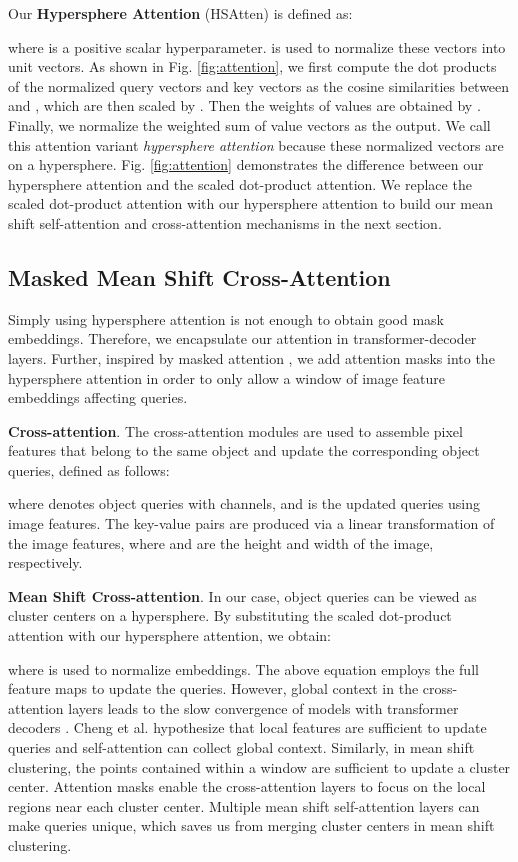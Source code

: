 \documentclass[letterpaper, 10 pt, conference]{ieeeconf}
\begin{document}
Our \textbf{Hypersphere Attention} (HSAtten) is defined as:

where  is a positive scalar hyperparameter.  is used to  normalize these vectors into unit vectors. As shown in Fig. \ref{fig:attention}, we first compute the dot products of the normalized query vectors and key vectors as the cosine similarities between  and , which are then scaled by . Then the weights of values are obtained by . Finally, we normalize the weighted sum of value vectors as the output. We call this attention variant \emph{hypersphere attention} because these  normalized vectors are on a hypersphere. Fig. \ref{fig:attention} demonstrates the difference between our hypersphere attention and the scaled dot-product attention. We replace the scaled dot-product attention with our hypersphere attention to build our mean shift self-attention and cross-attention mechanisms in the next section. 

\subsection{Masked Mean Shift Cross-Attention} 
\label{section:mscross-attention}
Simply using hypersphere attention is not enough to obtain good mask embeddings. Therefore, we encapsulate our attention in transformer-decoder layers. Further, inspired by masked attention \cite{cheng2022masked}, we add attention masks into the hypersphere attention in order to only allow a window of image feature embeddings affecting queries. 









\textbf{Cross-attention}. The cross-attention modules are used to assemble pixel features that belong to the same object and update the corresponding object queries, defined as follows:

where  denotes  object queries with  channels, and  is the updated queries using image features. The key-value pairs  are produced via a linear transformation of the image features, where  and  are the height and width of the image, respectively. 


\textbf{Mean Shift Cross-attention}. In our case, object queries can be viewed as cluster centers on a hypersphere. By substituting the scaled dot-product attention with our hypersphere attention, we obtain:

where  is used to  normalize embeddings. The above equation employs the full feature maps to update the queries. However, global context in the cross-attention layers leads to the slow convergence of models with transformer decoders \cite{gao2021fast, sun2021rethinking}. Cheng et al. \cite{cheng2022masked} hypothesize that local features are sufficient to update queries and self-attention can collect global context. Similarly, in mean shift clustering, the points contained within a window are sufficient to update a cluster center. Attention masks enable the cross-attention layers to focus on the local regions near each cluster center. Multiple mean shift self-attention layers can make queries unique, which saves us from merging cluster centers in mean shift clustering.
\end{document}
